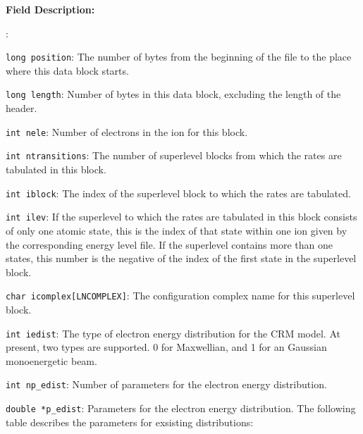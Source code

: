 \documentclass[twoside,letterpaper]{refrep}
\newenvironment{dbdesc}{\textbf{Field Description:} \begin{list}
	{:}{\setlength{\labelwidth}{2in}
	   \setlength{\leftmargin}{2in}
	   \setlength{\labelsep}{0.1in}
	   \setlength{\rightmargin}{0.2in}}}
	{\end{list}}
\begin{document}
\begin{dbdesc}
\item[\texttt{long position}:] The number of bytes from the beginning of the
file to the place where this data block starts.
\item[\texttt{long length}:] Number of bytes in this data block, excluding the
length of the header.
\item[\texttt{int nele}:] Number of electrons in the ion for this block.
\item[\texttt{int ntransitions}:] The number of superlevel blocks from which
the rates are tabulated in this block.
\item[\texttt{int iblock}:] The index of the superlevel block to which the
rates are tabulated.
\item[\texttt{int ilev}:] If the superlevel to which the rates are tabulated
in this block consists of only one atomic state, this is the index of that
state within one ion given by the corresponding energy level file. If the
superlevel contains more than one states, this number is the negative of the
index of the first state in the superlevel block.
\item[\texttt{char icomplex[LNCOMPLEX]}:] The configuration complex name for
this superlevel block.
\item[\texttt{int iedist}:] The type of electron energy distribution for the
CRM model. At present, two types are supported. 0 for Maxwellian, and 1 for an
Gaussian monoenergetic beam.
\item[\texttt{int np\_edist}:] Number of parameters for the electron energy
distribution.
\item[\texttt{double *p\_edist}:] Parameters for the electron energy
distribution. The following table describes the parameters for exsisting
distributions:


\end{dbdesc}
\end{document}
